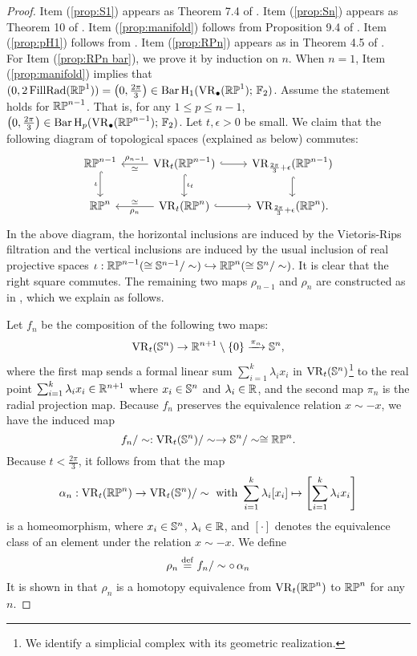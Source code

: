 \begin{proof}
Item (\ref{prop:S1}) appears as Theorem 7.4 of \cite{adamaszek2017vietoris}. Item (\ref{prop:Sn}) appears as Theorem 10 of \cite{lim2020vietoris}. 
Item (\ref{prop:manifold}) follows from Proposition 9.4 of \cite{lim2020vietoris}. Item (\ref{prop:pH1}) follows from 
\cite[Proposition 7.10]{virk20201}.
Item (\ref{prop:RPn}) appears as in Theorem 4.5 of \cite{adams2022metric}. \\

For Item (\ref{prop:RPn bar}), we prove it by induction on $n$. When $n=1$, Item (\ref{prop:manifold}) implies that $(0,2\operatorname{FillRad}(\mathbb{RP}^1)) = \left(0, \frac{2\pi}{3}\right)\in \operatorname{Bar} \operatorname{H}_{1}(\operatorname{VR}_\bullet(\mathbb{RP}^1);\,{\mathbb{F}_2})$. Assume the statement holds for $\mathbb{RP}^{n-1}$. That is, for any $1\leq p\leq n-1$, $\left(0, \frac{2\pi}{3}\right)\in\operatorname{Bar} \operatorname{H}_{p}(\operatorname{VR}_\bullet(\mathbb{RP}^{n-1});\,{\mathbb{F}_2})$. Let $t,\epsilon>0$ be small. We claim that the following diagram of topological spaces (explained as below) commutes:  
\[\begin{tikzcd}
\rp^{n-1}
\ar[d, hook,"{\iota}" left]
&
\VR_t(\rp^{n-1})
\ar[d, hook,"\iota_t"]
\ar[l, "\rho_{n-1}" above, "\simeq" below]
\ar[r, hook]
&
\VR_{\frac{2\pi}{3}+\epsilon}(\rp^{n-1})
\ar[d, hook]
\\
\rp^{n}
&
\VR_t(\rp^{n})
\ar[l, "\rho_n" below, "\simeq" above]
\ar[r, hook]
&
\VR_{\frac{2\pi}{3}+\epsilon}(\rp^{n}).
\end{tikzcd}\]
In the above diagram, the horizontal inclusions are induced by the Vietoris-Rips filtration and the vertical inclusions are induced by the usual inclusion of real projective spaces $\iota:\mathbb{RP}^{n-1}(\cong \mathbb{S}^{n-1}/\sim)\hookrightarrow \mathbb{RP}^{n}(\cong \mathbb{S}^{n}/\sim)$. It is clear that the right square commutes. The remaining two maps $\rho_{n-1}$ and $\rho_{n}$ are constructed as in \cite[]{adams2022metric}, which we explain as follows.

Let $f_n$ be the composition of the following two maps:
\[\operatorname{VR}_t(\mathbb{S}^n)\to \mathbb{R}^{n+1}\setminus\{0\} \xrightarrow{\pi_n} \mathbb{S}^{n},\]
where the first map sends a formal linear sum $\sum_{i=1}^k \lambda_i x_i$ in $\operatorname{VR}_t(\mathbb{S}^n)$\footnote{We identify a simplicial complex with its geometric realization.} to the real point $\sum_{i=1}^k \lambda_i x_i\in \mathbb{R}^{n+1}$ where $x_i\in \mathbb{S}^{n}$ and $\lambda_i\in \mathbb{R}$, and the second map $\pi_n$ is the radial projection map. Because $f_n$ preserves the equivalence relation $x\sim -x$, we have the induced map 
\[%
f_n/\sim:\VR_t(\bbS^{n})/\sim\to \bbS^{n}/\sim\cong \rp^n.\]
Because $t<\frac{2\pi}{3}$, it follows from \cite[Lemma 4.4]{adams2022metric} that the map 
\[\alpha_n: \operatorname{VR}_t(\mathbb{RP}^n)\to \operatorname{VR}_t(\mathbb{S}^n)/\sim\text{ with }\sum_{i=1}^k \lambda_i [x_i]\mapsto \left[\sum_{i=1}^k \lambda_i x_i\right]\]
is a homeomorphism, where $x_i\in \mathbb{S}^{n}$, $\lambda_i\in \mathbb{R}$, and $[\cdot]$ denotes the equivalence class of an element under the relation $x\sim -x$. We define 
\[\rho_n\stackrel{\mathrm{def}}{=} f_n/\sim \circ\,\alpha_n\]
It is shown in \cite[Theorem 4.5]{adams2022metric} that $\rho_n$ is a homotopy equivalence from $\operatorname{VR}_t(\mathbb{RP}^n)$ to $\mathbb{RP}^n$ for any $n$.


\end{proof}
